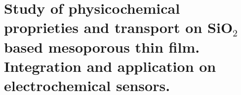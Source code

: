 \mtcaddchapter[Abstract]

\section*{\centering\large{\bfseries{Study of physicochemical proprieties and transport on SiO$_2$ based mesoporous thin film. Integration and application on electrochemical sensors.}}}







